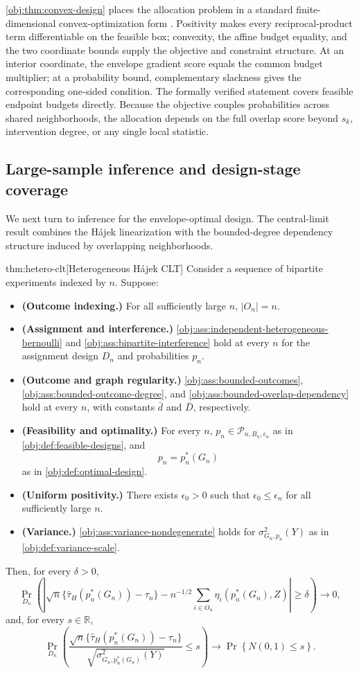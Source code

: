 \cref{obj:thm:convex-design} places the allocation problem in a standard finite-dimensional convex-optimization form \citep[Chs.~4--5]{BoydVandenberghe2004}. Positivity makes every reciprocal-product term differentiable on the feasible box; convexity, the affine budget equality, and the two coordinate bounds supply the objective and constraint structure. At an interior coordinate, the envelope gradient score equals the common budget multiplier; at a probability bound, complementary slackness gives the corresponding one-sided condition. The formally verified statement covers feasible endpoint budgets directly. Because the objective couples probabilities across shared neighborhoods, the allocation depends on the full overlap score beyond \(s_k\), intervention degree, or any single local statistic.

\subsection{Large-sample inference and design-stage coverage}

We next turn to inference for the envelope-optimal design. The central-limit result combines the Hájek linearization with the bounded-degree dependency structure induced by overlapping neighborhoods.

\begin{theoremv}{thm:hetero-clt}[Heterogeneous Hájek CLT]
Consider a sequence of bipartite experiments indexed by $n$. Suppose:
\begin{itemize}
\item \textbf{(Outcome indexing.)} For all sufficiently large $n$, $|O_n|=n$.
\item \textbf{(Assignment and interference.)} \cref{obj:ass:independent-heterogeneous-bernoulli} and \cref{obj:ass:bipartite-interference} hold at every $n$ for the assignment design $D_n$ and probabilities $p_n$.
\item \textbf{(Outcome and graph regularity.)} \cref{obj:ass:bounded-outcomes}, \cref{obj:ass:bounded-outcome-degree}, and \cref{obj:ass:bounded-overlap-dependency} hold at every $n$, with constants $\bar d$ and $\bar D$, respectively.
\item \textbf{(Feasibility and optimality.)} For every $n$, $p_n\in\mathcal P_{n,B_n,\epsilon_n}$ as in \cref{obj:def:feasible-designs}, and
\[
p_n=p_n^*(G_n)
\]
as in \cref{obj:def:optimal-design}.
\item \textbf{(Uniform positivity.)} There exists $\epsilon_0>0$ such that $\epsilon_0\le\epsilon_n$ for all sufficiently large $n$.
\item \textbf{(Variance.)} \cref{obj:ass:variance-nondegenerate} holds for $\sigma^2_{G_n,p_n}(Y)$ as in \cref{obj:def:variance-scale}.
\end{itemize}
Then, for every $\delta>0$,
\[
\Pr_{D_n}\!\left(
\left|
\sqrt n\bigl\{\widehat\tau_H(p_n^*(G_n))-\tau_n\bigr\}
-n^{-1/2}\sum_{i\in O_n}\eta_i(p_n^*(G_n),Z)
\right|\ge\delta
\right)\longrightarrow 0,
\]
and, for every $s\in\mathbb R$,
\[
\Pr_{D_n}\!\left(
\frac{\sqrt n\bigl\{\widehat\tau_H(p_n^*(G_n))-\tau_n\bigr\}}
{\sqrt{\sigma^2_{G_n,p_n^*(G_n)}(Y)}}\le s
\right)
\longrightarrow
\Pr\!\left\{N(0,1)\le s\right\}.
\]
\end{theoremv}


